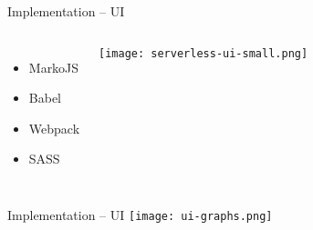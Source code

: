 \begin{frame}{Implementation -- UI}
  \begin{columns}
      \begin{itemize}
        \item MarkoJS
        \item Babel
        \item Webpack
        \item SASS
      \end{itemize}
      \vfill
      \centering
      \texttt{[image: serverless-ui-small.png]}
   \end{columns}
  \end{frame}

  \begin{frame}{Implementation -- UI}
    \vfill
    \centering
    \texttt{[image: ui-graphs.png]}
  \end{frame}
